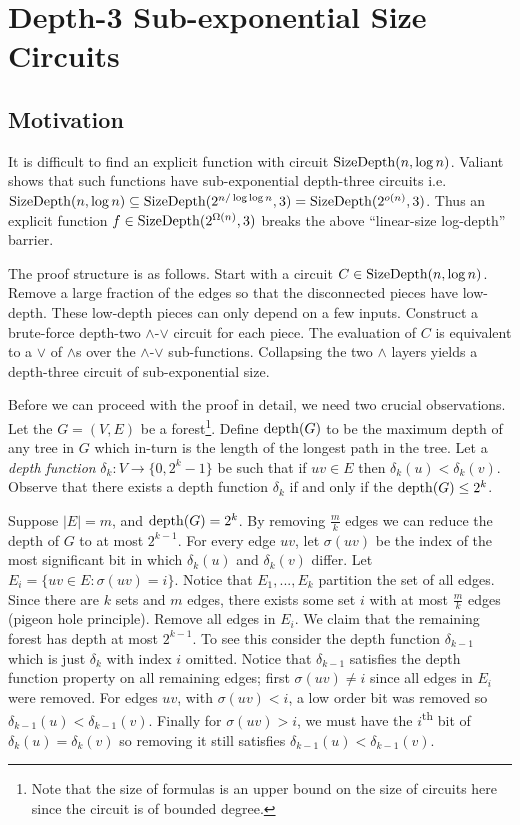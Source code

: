\documentclass[11pt]{article}
\begin{document}
 	\section{Depth-3 Sub-exponential Size Circuits}
 	\subsection{Motivation}
 	It is difficult to find an explicit function with circuit $\mathrm{SizeDepth}(n, \log n)$. Valiant shows that such functions have sub-exponential depth-three circuits i.e. $\mathrm{SizeDepth}(n, \log n) \subseteq \mathrm{SizeDepth}(2^{n/\log \log n}, 3) = \mathrm{SizeDepth}(2^{o(n)}, 3)$. Thus an explicit function $f \in \mathrm{SizeDepth}(2^{\Omega(n)}, 3)$ breaks the above ``linear-size log-depth'' barrier.
 	
 	The proof structure is as follows. Start with a circuit $C \in \mathrm{SizeDepth}(n, \log n)$. Remove a large fraction of the edges so that the disconnected pieces have low-depth. These low-depth pieces can only depend on a few inputs. Construct a brute-force depth-two $\land$-$\lor$ circuit for each piece. The evaluation of $C$ is equivalent to a $\lor$ of $\land$s over the $\land$-$\lor$ sub-functions. Collapsing the two $\land$ layers yields a depth-three circuit of sub-exponential size.
 	
 	Before we can proceed with the proof in detail, we need two crucial observations. Let the $G = (V, E)$ be a forest\footnote{Note that the size of formulas is an upper bound on the size of circuits here since the circuit is of bounded degree.}. Define $\operatorname*{depth}(G)$ to be the maximum depth of any tree in $G$ which in-turn is the length of the longest path in the tree. Let a \emph{depth function} $\delta_k: V \rightarrow \{0,2^{k}-1\}$ be such that if $uv \in E$ then $\delta_k(u) < \delta_k(v)$. Observe that there exists a depth function $\delta_k$ if and only if the $\operatorname*{depth}(G) \leq 2^{k}$. 
 	
 	Suppose $|E| = m$, and $\operatorname*{depth}(G) = 2^{k}$. By removing $\frac{m}{k}$ edges we can reduce the depth of $G$ to at most $2^{k-1}$. For every edge $uv$, let $\sigma(uv)$ be the index of the most significant bit in which $\delta_k(u)$ and $\delta_k(v)$ differ. Let $E_i = \{uv \in E: \sigma(uv) = i\}$. Notice that $E_1, ..., E_k$ partition the set of all edges. Since there are $k$ sets and $m$ edges, there exists some set $i$ with at most $\frac{m}{k}$ edges (pigeon hole principle). Remove all edges in $E_i$. We claim that the remaining forest has depth at most $2^{k-1}$. To see this consider the depth function $\delta_{k-1}$ which is just $\delta_k$ with index $i$ omitted. Notice that $\delta_{k-1}$ satisfies the depth function property on all remaining edges; first $\sigma(uv) \neq i$ since all edges in $E_i$ were removed. For edges $uv$, with $\sigma(uv) < i$, a low order bit was removed so $\delta_{k-1}(u) < \delta_{k-1}(v)$. Finally for $\sigma(uv) > i$, we must have the $i$\textsuperscript{th} bit of $\delta_k(u) = \delta_{k}(v)$ so removing it still satisfies $\delta_{k-1}(u) < \delta_{k-1}(v)$. 
 	
\end{document}
